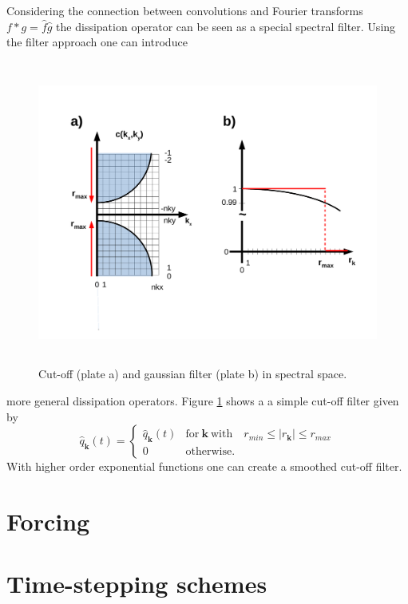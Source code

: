 Considering the connection between convolutions and Fourier transforms   
$f * g = \hat{f} \hat{g}$ the dissipation operator can be seen as a 
special spectral filter. Using the filter approach one can introduce 
\begin{figure}
   \includegraphics[height=10cm]{figures/diss_mask.pdf}
   \caption{Cut-off (plate a)  and gaussian filter (plate b) in 
            spectral space.}
   \label{fig_diss_mask}
\end{figure}
more general dissipation operators. Figure \ref{fig_diss_mask} shows a  
a simple cut-off filter given by
\begin{equation} \label{eq_cutoffDiss}
 \hat{q}_{\mathbf{k}}(t)
  = 
 \left\{
  \begin{array}{lcl}
   \hat{q}_{\mathbf{k}}(t)
    & 
   \mbox{for} \ \mathbf{k} \ \mbox{with}  
    & 
   r_{min} \leq |r_{\mathbf{k}}| \leq r_{max}
   \\
    0   
    &
   \mbox{otherwise}.
    &
  \end{array}
 \right.
\end{equation}
With higher order exponential functions one can create a smoothed cut-off
filter.
%
\section{Forcing}
%
\label{ssec_Fschemes}
%
\section{Time-stepping schemes}
%
\label{ssec_Tschemes}
